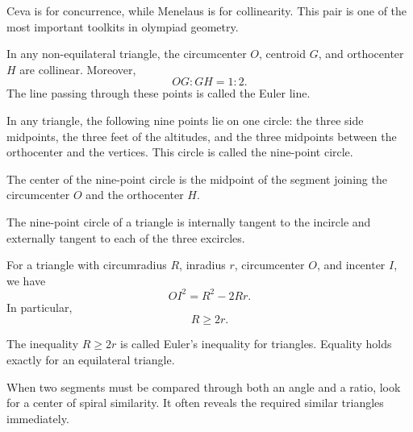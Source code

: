     \begin{remark}
        Ceva is for concurrence, while Menelaus is for collinearity. This pair
        is one of the most important toolkits in olympiad geometry.
    \end{remark}

    \begin{theorem}
        In any non-equilateral triangle, the circumcenter $O$, centroid $G$,
        and orthocenter $H$ are collinear. Moreover,
        \[
            OG:GH=1:2.
        \]
        The line passing through these points is called the Euler line.
    \end{theorem}

    \begin{theorem}
        In any triangle, the following nine points lie on one circle:
        the three side midpoints, the three feet of the altitudes, and the
        three midpoints between the orthocenter and the vertices. This circle
        is called the nine-point circle.
    \end{theorem}

    \begin{remark}
        The center of the nine-point circle is the midpoint of the segment
        joining the circumcenter $O$ and the orthocenter $H$.
    \end{remark}

    \begin{theorem}
        The nine-point circle of a triangle is internally tangent to the incircle
        and externally tangent to each of the three excircles.
    \end{theorem}

    \begin{theorem}
        For a triangle with circumradius $R$, inradius $r$, circumcenter $O$,
        and incenter $I$, we have
        \[
            OI^2=R^2-2Rr.
        \]
        In particular,
        \[
            R\geq 2r.
        \]
    \end{theorem}

    \begin{remark}
        The inequality $R\geq 2r$ is called Euler's inequality for triangles.
        Equality holds exactly for an equilateral triangle.
    \end{remark}

    \begin{strategy}
        When two segments must be compared through both an angle and a ratio,
        look for a center of spiral similarity. It often reveals the required
        similar triangles immediately.
    \end{strategy}

